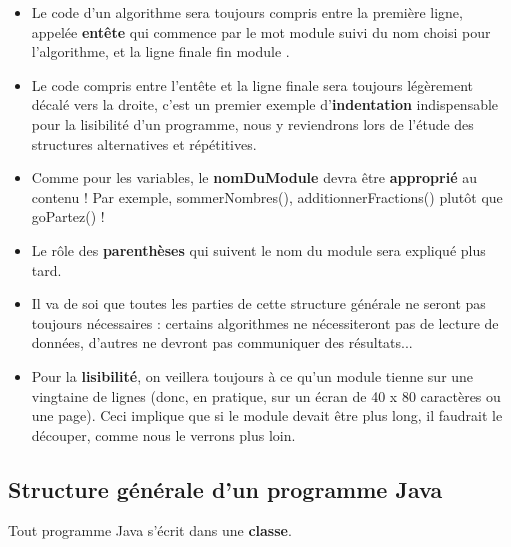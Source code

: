 \documentclass[11pt,a4paper]{article}
\begin{document}
					\begin{itemize}
				
			\item Le code d'un algorithme sera toujours compris entre la premi\`ere ligne, 
            appel\'ee \guillemotleft  \textbf{ent\^ete} \guillemotright  qui commence par le mot \guillemotleft  module \guillemotright  suivi du nom choisi pour l'algorithme,
            et la ligne finale \guillemotleft  fin module \guillemotright .
            
			\item Le code compris entre l'ent\^ete et la ligne finale sera toujours l\'eg\`erement d\'ecal\'e vers la droite, 
              c'est un premier exemple d'\textbf{indentation} indispensable pour la lisibilit\'e d'un programme, 
              nous y reviendrons lors de l'\'etude des structures alternatives et r\'ep\'etitives.
            
			\item Comme pour les variables, le \textbf{nomDuModule} 
            devra \^etre \textbf{appropri\'e} au contenu ! 
            Par exemple, sommerNombres(), additionnerFractions() plut\^ot que goPartez() ! 
            
			\item Le r\^ole des \textbf{parenth\`eses} qui suivent le nom du module sera expliqu\'e plus tard.
			\item Il va de soi que toutes les parties de cette structure g\'en\'erale ne seront pas toujours 
            n\'ecessaires : certains algorithmes ne n\'ecessiteront pas de lecture de donn\'ees, d'autres 
            ne devront pas communiquer des r\'esultats...
            
			\item Pour la \textbf{lisibilit\'e}, 
            on veillera toujours \`a ce qu'un module tienne sur une vingtaine de 
            lignes (donc, en pratique, sur un \'ecran de 40 x 80 caract\`eres ou une page). Ceci implique 
            que si le module devait \^etre plus long, il faudrait le d\'ecouper, comme nous le verrons 
            plus loin.
            
					\end{itemize}
				
            \par
        \subsection{Structure g\'en\'erale d'un programme Java}
          Tout programme Java s'\'ecrit dans une \textbf{classe}. 
          
\end{document}
